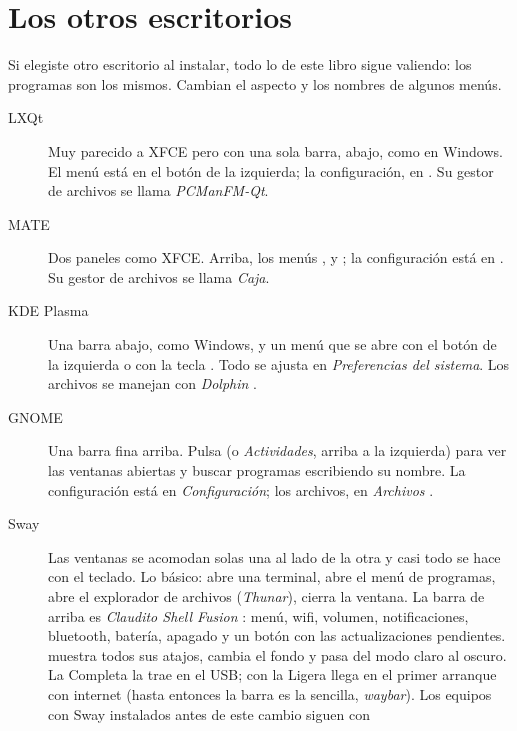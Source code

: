 \section{Los otros escritorios}

Si elegiste otro escritorio al instalar, todo lo de este libro sigue
valiendo: los programas son los mismos. Cambian el aspecto y los nombres
de algunos menús.

\begin{description}
  \item[LXQt] Muy parecido a XFCE pero con una sola barra, abajo, como en
    Windows. El menú está en el botón de la izquierda; la configuración, en
     \cite{lxqt-wiki}. Su
    gestor de archivos se llama \emph{PCManFM-Qt}.
  \item[MATE] Dos paneles como XFCE. Arriba, los menús ,
     y ; la configuración está en
     \cite{mate-docs}. Su gestor de archivos se
    llama \emph{Caja}.
  \item[KDE Plasma] Una barra abajo, como Windows, y un menú que se abre con
    el botón de la izquierda o con la tecla . Todo se ajusta
    en \emph{Preferencias del sistema}. Los archivos se manejan con
    \emph{Dolphin} \cite{kde-userbase}.
  \item[GNOME] Una barra fina arriba. Pulsa  (o
    \emph{Actividades}, arriba a la izquierda) para ver las ventanas
    abiertas y buscar programas escribiendo su nombre. La configuración
    está en \emph{Configuración}; los archivos, en \emph{Archivos}
    \cite{gnome-help}.
  \item[Sway] Las ventanas se acomodan solas una al lado de la otra y casi
    todo se hace con el teclado. Lo básico:  abre
    una terminal,  abre el menú de programas,
     abre el explorador de archivos (\emph{Thunar}),
     cierra la ventana. La barra de arriba es
    \emph{Claudito Shell Fusion} \cite{claudito-shell}: menú, wifi,
    volumen, notificaciones, bluetooth, batería, apagado y un botón con
    las actualizaciones pendientes.  muestra
    todos sus atajos,  cambia el fondo y
     pasa del modo claro al oscuro. La Completa
    la trae en el USB; con la Ligera llega en el primer arranque con
    internet (hasta entonces la barra es la sencilla, \emph{waybar}). Los equipos con Sway instalados antes de este cambio siguen con

\end{description}
